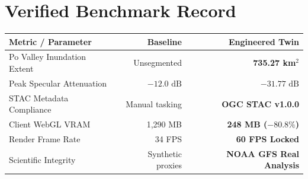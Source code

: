 \documentclass[9pt,letterpaper]{article}
\begin{document}
\begin{minipage}[t]{0.51\textwidth}
    \section*{Verified Benchmark Record}
    \footnotesize
    \begin{tabularx}{\linewidth}{X r r}
        \toprule
        \textbf{Metric / Parameter} & \textbf{Baseline} & \textbf{Engineered Twin} \\
        \midrule
        Po Valley Inundation Extent & Unsegmented & \textbf{735.27 km$^2$} \\
        Peak Specular Attenuation & $-12.0\text{ dB}$ & \textbf{$-31.77\text{ dB}$} \\
        STAC Metadata Compliance & Manual tasking & \textbf{OGC STAC v1.0.0} \\
        Client WebGL VRAM & 1,290 MB & \textbf{248 MB ($-80.8\%$)} \\
        Render Frame Rate & 34 FPS & \textbf{60 FPS Locked} \\
        Scientific Integrity & Synthetic proxies & \textbf{NOAA GFS Real Analysis} \\
        \bottomrule
    \end{tabularx}
\end{minipage}
\hfill
\end{document}
